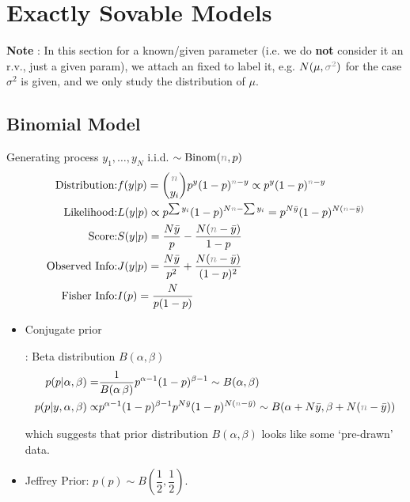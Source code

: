 \section{Exactly Sovable Models}
\textbf{Note} : In this section for a known/given parameter (i.e. we do \textbf{not} consider it an r.v., just a given param), we attach an fixed to label it, e.g. $ N(\mu ,\fixed{\sigma^2} ) $ for the case $ \sigma^2 $ is given, and we only study the distribution of $ \mu  $.


    
\subsection{Binomial Model}\label{SubSubSectionBayesianBinomial}
Generating process $ y_1,\ldots,y_N $ i.i.d. $ \sim \mathrm{Binom}(\fixed{n},p) $
\begin{align*}
    \text{Distribution:}&f(y|p)=\binom{\fixed{n}}{y_i}p^{y}(1-p)^{\fixed{n}-y}\propto p^y(1-p)^{\fixed{n}-y}\\
    \text{Likelihood:}&L(y|p)\propto p^{\sum y_i}(1-p )^{N\fixed{n}-\sum y_i}=p^{N\bar{y}}(1-p)^{N(\fixed{n}-\bar{y})}\\
    \text{Score:}&S(y|p)=\dfrac{N\bar{y}}{p}- \dfrac{N(\fixed{n}-\bar{y})}{1-p}\\
    \text{Observed Info:}&J(y|p)=\dfrac{N\bar{y}}{p^2}+\dfrac{N(\fixed{n}-\bar{y})}{(1-p)^2}\\
    \text{Fisher Info:}&I(p)=\dfrac{N}{p(1-p)}
\end{align*}


\begin{itemize}[topsep=2pt,itemsep=0pt]
    \item \hypertarget{BinomConjugate}{Conjugate prior}: Beta distribution $ B(\alpha ,\beta ) $
    \begin{align*}
        p(p |\alpha ,\beta )=&\dfrac{ 1 }{ B(\alpha \, \beta ) } p ^{\alpha -1}(1-p )^{\beta -1}\sim B(\alpha ,\beta ) \\
        p(p |y,\alpha ,\beta )\propto &  p ^{\alpha -1}(1-p )^{\beta -1}p^{N\bar{y}}(1-p)^{N(\fixed{n}-\bar{y})}\sim B(\alpha +N\bar{y}, \beta +N(\fixed{n}-\bar{y}))
    \end{align*}

    which suggests that prior distribution $ B(\alpha ,\beta ) $ looks like some `pre-drawn' data.
    \item Jeffrey Prior: $ p(p)\sim B(\dfrac{ 1 }{ 2 } , \dfrac{ 1 }{ 2 }) $.
\end{itemize}


